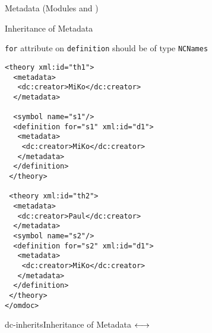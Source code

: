 \begin{tchapter}[id=metadata,short=Metadata]{Metadata (Modules {} and  {})}
\begin{tsection}[id=inheritance]{Inheritance of Metadata}
\begin{erratum}[reported-by=Michael Kohlhase,date=2009-08-11]{{\texttt{for}} attribute on
    {\texttt{definition}} should be of type {\texttt{NCNames}}}
{\begin{minipage}{5cm}
\begin{lstlisting}[label=inheritanceb,index={metadata,dc:creator},frame=none,numbers=none]
 <theory xml:id="th1">
  <metadata>
   <dc:creator>MiKo</dc:creator>
  </metadata>
  
  <symbol name="s1"/>
  <definition for="s1" xml:id="d1">
   <metadata>
    <dc:creator>MiKo</dc:creator>
   </metadata>
  </definition>
 </theory>

 <theory xml:id="th2">
  <metadata>
   <dc:creator>Paul</dc:creator>
  </metadata>
  <symbol name="s2"/>
  <definition for="s2" xml:id="d1">
   <metadata>
    <dc:creator>MiKo</dc:creator>
   </metadata>
  </definition>
 </theory>
</omdoc>
\end{lstlisting}
\end{minipage}}
\begin{myfig}{dc-inherits}{Inheritance of Metadata}
$\hfill\longleftrightarrow\hfill$
\end{myfig}
\end{erratum}

\end{tsection}
\end{tchapter}


